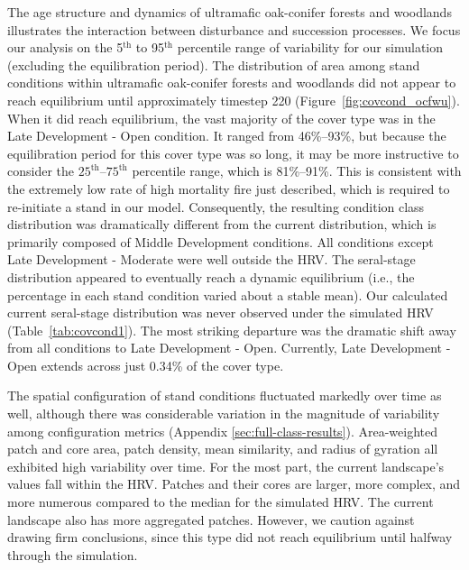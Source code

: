 The age structure and dynamics of ultramafic oak-conifer forests and woodlands illustrates the interaction between disturbance and succession processes. We focus our analysis on the 5$^{\text{th}}$ to 95$^{\text{th}}$ percentile range of variability for our simulation (excluding the equilibration period). %
%
The distribution of area among stand conditions within ultramafic oak-conifer forests and woodlands did not appear to reach equilibrium until approximately timestep 220 (Figure~\ref{fig:covcond_ocfwu}). When it did reach equilibrium, the vast majority of the cover type was in the Late Development - Open condition. It ranged from 46\%--93\%, but because the equilibration period for this cover type was so long, it may be more instructive to consider the $25^{\text{th}}$--$75^{\text{th}}$ percentile range, which is 81\%--91\%. This is consistent with the extremely low rate of high mortality fire just described, which is required to re-initiate a stand in our model. Consequently, the resulting condition class distribution was dramatically different from the current distribution, which is primarily composed of Middle Development conditions. All conditions except Late Development - Moderate were well outside the HRV. %
%
The seral-stage distribution appeared to eventually reach a dynamic equilibrium (i.e., the percentage in each stand condition varied about a stable mean). Our calculated current seral-stage distribution was never observed under the simulated HRV (Table~\ref{tab:covcond1}). The most striking departure was the dramatic shift away from all conditions to Late Development - Open. Currently, Late Development - Open extends across just 0.34\% of the cover type. 

The spatial configuration of stand conditions fluctuated markedly over time as well, although there was considerable variation in the magnitude of variability among configuration metrics (Appendix \ref{sec:full-class-results}). Area-weighted patch and core area, patch density, mean similarity, and radius of gyration all exhibited high variability over time. For the most part, the current landscape's values fall within the HRV. Patches and their cores are larger, more complex, and more numerous compared to the median for the simulated HRV. The current landscape also has more aggregated patches. However, we caution against drawing firm conclusions, since this type did not reach equilibrium until halfway through the simulation.

